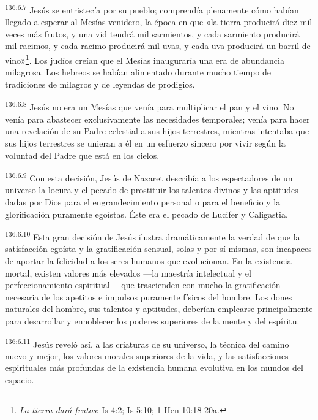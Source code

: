 \par 
\textsuperscript{136:6.7} Jesús se entristecía por su pueblo; comprendía plenamente cómo habían llegado a esperar al Mesías venidero, la época en que «la tierra producirá diez mil veces más frutos, y una vid tendrá mil sarmientos, y cada sarmiento producirá mil racimos, y cada racimo producirá mil uvas, y cada uva producirá un barril de vino»\footnote{\textit{La tierra dará frutos}: Is 4:2; Is 5:10; 1 Hen 10:18-20a.}. Los judíos creían que el Mesías inauguraría una era de abundancia milagrosa. Los hebreos se habían alimentado durante mucho tiempo de tradiciones de milagros y de leyendas de prodigios.

\par 
\textsuperscript{136:6.8} Jesús no era un Mesías que venía para multiplicar el pan y el vino. No venía para abastecer exclusivamente las necesidades temporales; venía para hacer una revelación de su Padre celestial a sus hijos terrestres, mientras intentaba que sus hijos terrestres se unieran a él en un esfuerzo sincero por vivir según la voluntad del Padre que está en los cielos.

\par 
\textsuperscript{136:6.9} Con esta decisión, Jesús de Nazaret describía a los espectadores de un universo la locura y el pecado de prostituir los talentos divinos y las aptitudes dadas por Dios para el engrandecimiento personal o para el beneficio y la glorificación puramente egoístas. Éste era el pecado de Lucifer y Caligastia.

\par 
\textsuperscript{136:6.10} Esta gran decisión de Jesús ilustra dramáticamente la verdad de que la satisfacción egoísta y la gratificación sensual, solas y por sí mismas, son incapaces de aportar la felicidad a los seres humanos que evolucionan. En la existencia mortal, existen valores más elevados ---la maestría intelectual y el perfeccionamiento espiritual--- que trascienden con mucho la gratificación necesaria de los apetitos e impulsos puramente físicos del hombre. Los dones naturales del hombre, sus talentos y aptitudes, deberían emplearse principalmente para desarrollar y ennoblecer los poderes superiores de la mente y del espíritu.

\par 
\textsuperscript{136:6.11} Jesús reveló así, a las criaturas de su universo, la técnica del camino nuevo y mejor, los valores morales superiores de la vida, y las satisfacciones espirituales más profundas de la existencia humana evolutiva en los mundos del espacio.

